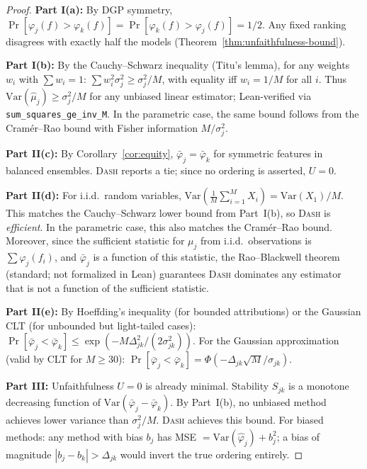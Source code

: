 \documentclass{article}
\newcommand{\Var}{\mathrm{Var}}
\newcommand{\DASH}{\textsc{Dash}}
\begin{document}
\begin{proof}
\textbf{Part I(a):} By DGP symmetry, $\Pr[\varphi_j(f) > \varphi_k(f)] = \Pr[\varphi_k(f) > \varphi_j(f)] = 1/2$. Any fixed ranking disagrees with exactly half the models (Theorem~\ref{thm:unfaithfulness-bound}).

\textbf{Part I(b):} By the Cauchy--Schwarz inequality (Titu's lemma), for any weights $w_i$ with $\sum w_i = 1$: $\sum w_i^2 \sigma_j^2 \geq \sigma_j^2/M$, with equality iff $w_i = 1/M$ for all $i$. Thus $\Var(\hat\mu_j) \geq \sigma_j^2/M$ for any unbiased linear estimator; Lean-verified via \texttt{sum\_squares\_ge\_inv\_M}. In the parametric case, the same bound follows from the Cram\'er--Rao bound with Fisher information $M/\sigma_j^2$.

\textbf{Part II(c):} By Corollary~\ref{cor:equity}, $\bar\varphi_j = \bar\varphi_k$ for symmetric features in balanced ensembles. \DASH{} reports a tie; since no ordering is asserted, $U = 0$.

\textbf{Part II(d):} For i.i.d.\ random variables, $\Var(\frac{1}{M}\sum_{i=1}^M X_i) = \Var(X_1)/M$. This matches the Cauchy--Schwarz lower bound from Part~I(b), so \DASH{} is \emph{efficient}. In the parametric case, this also matches the Cram\'er--Rao bound. Moreover, since the sufficient statistic for $\mu_j$ from i.i.d.\ observations is $\sum \varphi_j(f_i)$, and $\bar\varphi_j$ is a function of this statistic, the Rao--Blackwell theorem (standard; not formalized in Lean) guarantees \DASH{} dominates any estimator that is not a function of the sufficient statistic.

\textbf{Part II(e):} By Hoeffding's inequality (for bounded attributions) or the Gaussian CLT (for unbounded but light-tailed cases): $\Pr[\bar\varphi_j < \bar\varphi_k] \leq \exp(-M\Delta_{jk}^2/(2\sigma_{jk}^2))$. For the Gaussian approximation (valid by CLT for $M \geq 30$): $\Pr[\bar\varphi_j < \bar\varphi_k] = \Phi(-\Delta_{jk}\sqrt{M}/\sigma_{jk})$.

\textbf{Part III:} Unfaithfulness $U = 0$ is already minimal. Stability $S_{jk}$ is a monotone decreasing function of $\Var(\bar\varphi_j - \bar\varphi_k)$. By Part~I(b), no unbiased method achieves lower variance than $\sigma_j^2/M$. \DASH{} achieves this bound. For biased methods: any method with bias $b_j$ has MSE $= \Var(\hat\varphi_j) + b_j^2$; a bias of magnitude $|b_j - b_k| > \Delta_{jk}$ would invert the true ordering entirely.
\end{proof}
\end{document}
